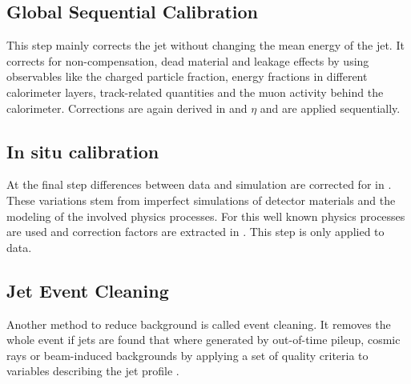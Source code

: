 \subsection{Global Sequential Calibration}

This step mainly corrects the jet \pt without changing the mean energy of the jet. It corrects for non-compensation, dead material and leakage effects by using observables like the charged particle fraction, energy fractions in different calorimeter layers, track-related quantities and the muon activity behind the calorimeter. Corrections are again derived in \pt and $\eta$ and are applied sequentially.

\subsection{In situ calibration}
At the final step differences between data and simulation are corrected for in \pt. These variations stem from imperfect simulations of detector materials and the modeling of the involved physics processes. For this well known physics processes are used and correction factors are extracted in \pt. This step is only applied to data.

\subsection{Jet Event Cleaning}
Another method to reduce background is called event cleaning. It removes the whole event if jets are found that where generated by out-of-time pileup, cosmic rays or beam-induced backgrounds by applying a set of quality criteria to variables describing the jet profile \citep{ATLAS-CONF-2015-029}.

